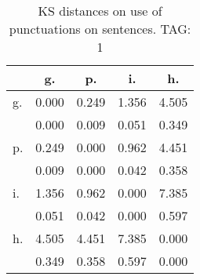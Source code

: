\begin{table}[h!]
\begin{center}
\begin{tabular}{| l | c | c | c | c |}\hline
 & g. & p. & i. & h. \\\hline
g. & 0.000  & 0.249  & 1.356  & 4.505 \\\hline
 & 0.000  & 0.009  & 0.051  & 0.349 \\\hline
p. & 0.249  & 0.000  & 0.962  & 4.451 \\\hline
 & 0.009  & 0.000  & 0.042  & 0.358 \\\hline
i. & 1.356  & 0.962  & 0.000  & 7.385 \\\hline
 & 0.051  & 0.042  & 0.000  & 0.597 \\\hline
h. & 4.505  & 4.451  & 7.385  & 0.000 \\\hline
 & 0.349  & 0.358  & 0.597  & 0.000 \\\hline
\end{tabular}
\caption{KS distances on use of punctuations on sentences. TAG: 1}
\end{center}
\end{table}